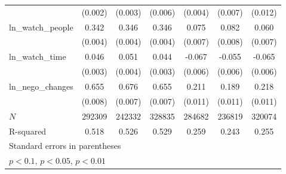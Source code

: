 {\begin{tabular}{l*{6}{c}}
            &     (0.002)         &     (0.003)         &     (0.006)         &     (0.004)         &     (0.007)         &     (0.012)         \\
\addlinespace
ln\_watch\_people&       0.342\sym{***}&       0.346\sym{***}&       0.346\sym{***}&       0.075\sym{***}&       0.082\sym{***}&       0.060\sym{***}\\
            &     (0.004)         &     (0.004)         &     (0.004)         &     (0.007)         &     (0.008)         &     (0.007)         \\
\addlinespace
ln\_watch\_time&       0.046\sym{***}&       0.051\sym{***}&       0.044\sym{***}&      -0.067\sym{***}&      -0.055\sym{***}&      -0.065\sym{***}\\
            &     (0.003)         &     (0.004)         &     (0.003)         &     (0.006)         &     (0.006)         &     (0.006)         \\
\addlinespace
ln\_nego\_changes&       0.655\sym{***}&       0.676\sym{***}&       0.655\sym{***}&       0.211\sym{***}&       0.189\sym{***}&       0.218\sym{***}\\
            &     (0.008)         &     (0.007)         &     (0.007)         &     (0.011)         &     (0.011)         &     (0.011)         \\
\midrule
\(N\)       &      292309         &      242332         &      328835         &      284682         &      236819         &      320074         \\
R-squared   &       0.518         &       0.526         &       0.529         &       0.259         &       0.243         &       0.255         \\
\bottomrule
\multicolumn{7}{l}{\footnotesize Standard errors in parentheses}\\
\multicolumn{7}{l}{\footnotesize \sym{*} \(p<0.1\), \sym{**} \(p<0.05\), \sym{***} \(p<0.01\)}\\
\end{tabular}
}

